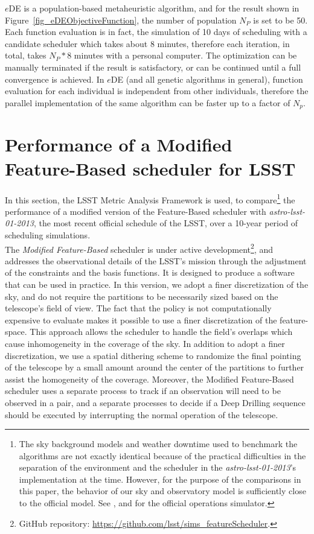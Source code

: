 \documentclass[12pt]{aastex62}
\theoremstyle{definition}
\begin{document}
$e$DE is a population-based metaheuristic algorithm, and for the result shown in Figure~\ref{fig_eDEObjectiveFunction}, the number of population $N_P$ is set to be 50. Each function evaluation is in fact, the simulation of 10 days of scheduling with a candidate scheduler which takes about 8 minutes, therefore each iteration, in total, takes $N_P * 8$ minutes with a personal computer. The optimization can be manually terminated if the result is satisfactory, or can be continued until a full convergence is achieved. In $e$DE (and all genetic algorithms in general), function evaluation for each individual is independent from other individuals, therefore the parallel implementation of the same algorithm can be faster up to a factor of $N_p$. 

 
\section{Performance of a Modified Feature-Based scheduler for LSST}\label{sec_comp}
In this section, the LSST Metric Analysis Framework \citep{jones2014lsst} is used, to compare\footnote{The sky background models and weather downtime used to benchmark the algorithms are not exactly identical because of the practical difficulties in the separation of the environment and the scheduler in the \textit{astro-lsst-01-2013}'s implementation at the time. However, for the purpose of the comparisons in this paper, the behavior of our sky and observatory model is sufficiently close to the official model. See \citep{2016SPIE.9910E..13D}, and \citep{2016SPIE.9911E..25R} for the official operations simulator.} the performance of a modified version of the Feature-Based scheduler with \textit{astro-lsst-01-2013}, the most recent official schedule of the LSST, over a 10-year period of scheduling simulations.\\
The \textit{Modified Feature-Based} scheduler is under active development\footnote{GitHub repository: \url{https://github.com/lsst/sims_featureScheduler}.}, and addresses the observational details of the LSST's mission through the adjustment of the constraints and the basis functions. It is designed to produce a software that can be used in practice. In this version, we adopt a finer discretization of the sky, and do not require the partitions to be necessarily sized based on the telescope's field of view. The fact that the policy is not computationally expensive to evaluate makes it possible to use a finer discretization of the feature-space. This approach allows the scheduler to handle the field's overlaps which cause inhomogeneity in the coverage of the sky. In addition to adopt a finer discretization, we use a spatial dithering scheme to randomize the final pointing of the telescope by a small amount around the center of the partitions to further assist the homogeneity of the coverage. Moreover, the Modified Feature-Based scheduler uses a separate process to track if an observation will need to be observed in a pair, and a separate processes to decide if a Deep Drilling sequence should be executed by interrupting the normal operation of the telescope.
\end{document}

